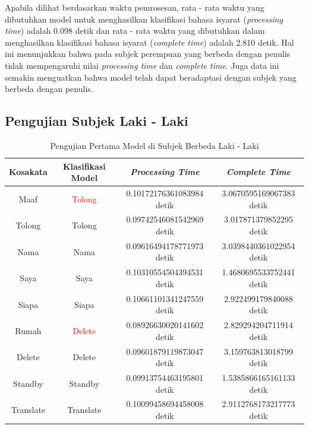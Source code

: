 Apabila dilihat berdasarkan waktu pemrosesan, rata - rata waktu yang dibutuhkan model untuk menghasilkan klasifikasi bahasa isyarat (\emph{processing time}) adalah 0.098 detik dan rata - rata waktu yang dibutuhkan dalam menghasilkan klasifikasi bahasa isyarat (\emph{complete time}) adalah 2.810 detik. Hal ini menunjukkan bahwa pada subjek perempuan yang berbeda dengan penulis tidak mempengaruhi nilai \emph{processing time} dan \emph{complete time}. Juga data ini semakin menguatkan bahwa model telah dapat beradaptasi dengan subjek yang berbeda dengan penulis.  

\subsection{Pengujian Subjek Laki - Laki}
\label{sec:analisislaki}

\begin{longtable}{|c|c|c|c|}
  \caption{Pengujian Pertama Model di Subjek Berbeda Laki - Laki}
  \label{tb:prediksilaki1}                                   \\
  \hline
  \rowcolor[HTML]{C0C0C0}
  \textbf{Kosakata} & \textbf{Klasifikasi Model} & \textbf{\emph{Processing Time}} & \textbf{\emph{Complete Time}}\\
  \hline
  Maaf              & \textcolor{red}{Tolong}        & 0.10172176361083984 detik                           & 3.0670595169067383 detik                                  \\
  Tolong            & Tolong                         & 0.09742546081542969 detik                           & 3.017871379852295 detik                                 \\
  Nama              & Nama                           & 0.09616494178771973 detik                           & 3.0398440361022954 detik                                  \\
  Saya              & Saya                           & 0.10310554504394531 detik                           & 1.4680695533752441 detik                                  \\
  Siapa             & Siapa                          & 0.10661101341247559 detik                           & 2.922499179840088 detik                                 \\
  Rumah             & \textcolor{red}{Delete}        & 0.08926630020141602 detik                           & 2.829294204711914 detik                                 \\
  Delete            & Delete                         & 0.09601879119873047 detik                           & 3.159763813018799 detik                                 \\
  Standby           & Standby                        & 0.09913754463195801 detik                           & 1.5385866165161133 detik                                  \\
  Translate         & Translate                      & 0.10099458694458008 detik                           & 2.9112768173217773 detik                                  \\
  \hline
\end{longtable}

